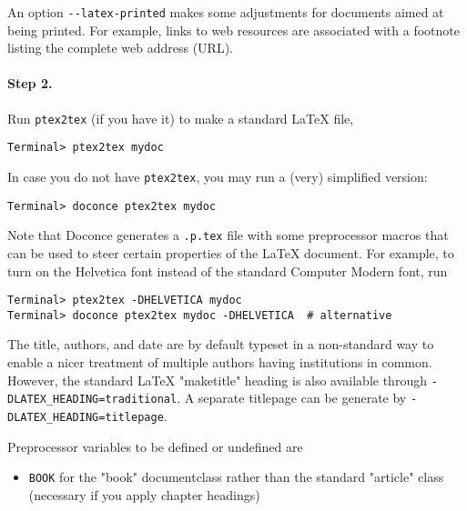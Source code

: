 \documentclass[%
oneside,                 %
final,                   %
10pt]{article}
\begin{document}
{{{An option {\fontsize{10pt}{10pt}\Verb!--latex-printed!} makes some adjustments for documents
aimed at being printed. For example, links to web resources are
associated with a footnote listing the complete web address (URL).

\paragraph{Step 2.}
Run {\fontsize{10pt}{10pt}\Verb!ptex2tex!} (if you have it) to make a standard {\LaTeX} file,
\vspace{4pt}
\begin{Verbatim}[numbers=none,frame=lines,label=\fbox{{\tiny Terminal}},fontsize=\fontsize{9pt}{9pt},
labelposition=topline,framesep=2.5mm,framerule=0.7pt]
Terminal> ptex2tex mydoc
\end{Verbatim}
In case you do not have {\fontsize{10pt}{10pt}\Verb!ptex2tex!}, you may run a (very) simplified version:
\vspace{4pt}
\begin{Verbatim}[numbers=none,frame=lines,label=\fbox{{\tiny Terminal}},fontsize=\fontsize{9pt}{9pt},
labelposition=topline,framesep=2.5mm,framerule=0.7pt]
Terminal> doconce ptex2tex mydoc
\end{Verbatim}

Note that Doconce generates a {\fontsize{10pt}{10pt}\Verb!.p.tex!} file with some preprocessor macros
that can be used to steer certain properties of the {\LaTeX} document.
For example, to turn on the Helvetica font instead of the standard
Computer Modern font, run
\vspace{4pt}
\begin{Verbatim}[numbers=none,frame=lines,label=\fbox{{\tiny Terminal}},fontsize=\fontsize{9pt}{9pt},
labelposition=topline,framesep=2.5mm,framerule=0.7pt]
Terminal> ptex2tex -DHELVETICA mydoc
Terminal> doconce ptex2tex mydoc -DHELVETICA  # alternative
\end{Verbatim}
The title, authors, and date are by default typeset in a non-standard
way to enable a nicer treatment of multiple authors having
institutions in common. However, the standard {\LaTeX} "maketitle" heading
is also available through {\fontsize{10pt}{10pt}\Verb!-DLATEX_HEADING=traditional!}.
A separate titlepage can be generate by
{\fontsize{10pt}{10pt}\Verb!-DLATEX_HEADING=titlepage!}.

Preprocessor variables to be defined or undefined are

\begin{itemize}
 \item {\fontsize{10pt}{10pt}\Verb!BOOK!} for the "book" documentclass rather than the standard
   "article" class (necessary if you apply chapter headings)


\end{itemize}}}}
\end{document}

